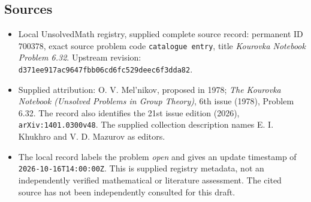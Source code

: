 \documentclass[11pt]{article}
\begin{document}
\subsection{Sources}
\begin{itemize}
\item Local UnsolvedMath registry, supplied complete source record: permanent ID \(700378\), exact source problem code \texttt{catalogue entry}, title \emph{Kourovka Notebook Problem 6.32}. Upstream revision: \texttt{d371ee917ac9647fbb06cd6fc529deec6f3dda82}.
\item Supplied attribution: O. V. Mel'nikov, proposed in 1978; \emph{The Kourovka Notebook (Unsolved Problems in Group Theory)}, 6th issue (1978), Problem 6.32. The record also identifies the 21st issue edition (2026), \texttt{arXiv:1401.0300v48}. The supplied collection description names E. I. Khukhro and V. D. Mazurov as editors.
\item The local record labels the problem \emph{open} and gives an update timestamp of \texttt{2026-10-16T14:00:00Z}. This is supplied registry metadata, not an independently verified mathematical or literature assessment. The cited source has not been independently consulted for this draft.
\end{itemize}
\end{document}
